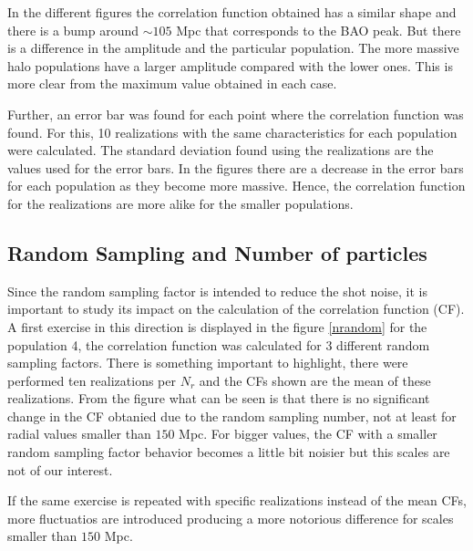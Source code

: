 In the different figures the correlation function obtained has a similar 
shape and there is a bump around $\sim 105$ Mpc that corresponds
to the BAO peak. 
But there is a difference in the amplitude and the particular population. 
The more massive halo populations have a larger amplitude
compared with the lower ones. This is more clear from the maximum value obtained in
each case. 

Further, an error bar was found for each point where the correlation function 
was found. For this, 10 realizations with the same characteristics for each
population were calculated. The standard deviation found using the realizations
are the values used for the error bars. 
In the figures there are a decrease in the error bars for each population as they 
become more massive. Hence, the correlation function for the realizations are more alike 
for the smaller populations. 


\subsection{ Random Sampling and Number of particles}


Since the random sampling factor is intended to reduce the shot 
noise, it is important to study its impact on the calculation
of the correlation function (CF). A first exercise in this direction
is displayed in the figure \ref{nrandom} for the population 4, 
the correlation function was calculated for 3 different random sampling factors. 
There is something important to highlight, there were performed
ten realizations per $N_{r}$ and the CFs shown are the mean of these
realizations. From the figure what can be seen is that there is no 
significant change in the CF obtanied due to the random sampling number, 
not at least for radial values smaller than $150$ Mpc. 
For bigger values, the CF with a smaller random sampling factor 
behavior becomes a little bit noisier but this scales are not of our interest.

If the same exercise is repeated with specific realizations instead of the
mean CFs, more fluctuatios are introduced producing a more notorious difference
for scales smaller than $150$ Mpc. 

